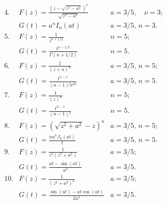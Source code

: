 \documentclass[10pt]{article}
\begin{document}
\[
\begin{array}{llr}
 4. & F(z)= \frac{(z-\sqrt{z^{2}-a^{2}})^{\nu}}{\sqrt{z^{2}-a^{2}}} &  a=3/5,  \quad \nu=3; \\[1cm]
 & G(t)= a^{n}I_{n}(at) & a=3/5, \, n=3.\\[1cm]
5. &  F(z)= \frac{1}{z^{n+1/2}} &  n=5; \\[1cm]
&  G(t)= \frac{t^{n-1/2}}{\Gamma(n+1/2)} & n=5.\\[1cm]
6. &  F(z)= \frac{1}{(z+a)^{n}} &  a=3/5, \, n=5; \\[1cm]
&  G(t)= \frac{t^{n-1}}{(n-1)!e^{at}} & a=3/5, \, n=5.\\[1cm]
 7. & F(z)= \frac{1}{(z)^{n}} &   n=5; \\[1cm]
  & G(t)= \frac{t^{n-1}}{(n-1)!} &  n=5.\\[1cm]
8. &  F(z)= (\sqrt{z^{2}+a^{2}}-z )^{n} &  a=3/5, \, n=5; \\[1cm]
  & G(t)= \frac{na^{n}J_n(at)}{t} & a=3/5, \, n=5.\\[1cm]
9. & F(z)= \frac{1}{z^{2}(z^{2}+a^{2})} &   a=3/5; \\[1cm]
  & G(t)= \frac{at-\sin(at)}{a^{3}} &  a=3/5.\\[1cm]
10. & F(z)= \frac{1}{(z^{2}+a^{2})^{2}} &   a=3/5; \\[1cm]
  & G(t)= \frac{\sin(at)-at\cos(at)}{2a^{3}} &  a=3/5.\\[1cm]
\end{array}
 \]
\end{document}
